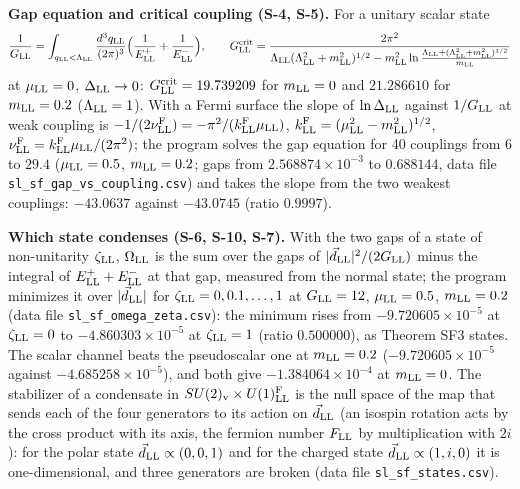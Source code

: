 \documentclass[
  10pt,
]{article}
\begin{document}
\textbf{Gap equation and critical coupling (S-4, S-5).} For a unitary
scalar state
\[\frac1{G_{\rm LL}}=\int_{q_{\rm LL}<\Lambda_{\rm LL}}\frac{d^3q_{\rm LL}}{(2\pi)^3}\Big(\frac1{E^+_{\rm LL}}+\frac1{E^-_{\rm LL}}\Big),\qquad
G^{\rm crit}_{\rm LL}=\frac{2\pi^2}{\Lambda_{\rm LL}(\Lambda_{\rm LL}^2+m_{\rm LL}^2)^{1/2}-m_{\rm LL}^2\ln\frac{\Lambda_{\rm LL}+(\Lambda_{\rm LL}^2+m_{\rm LL}^2)^{1/2}}{m_{\rm LL}}}\]
at \(\mu_{\rm LL}=0\), \(\Delta_{\rm LL}\to0\):
\(G^{\rm crit}_{\rm LL}=19.739209\) for \(m_{\rm LL}=0\) and
\(21.286610\) for \(m_{\rm LL}=0.2\) (\(\Lambda_{\rm LL}=1\)). With a
Fermi surface the slope of \(\ln\Delta_{\rm LL}\) against
\(1/G_{\rm LL}\) at weak coupling is
\(-1/(2\nu^{\rm F}_{\rm LL})=-\pi^2/(k^{\rm F}_{\rm LL}\mu_{\rm LL})\),
\(k^{\rm F}_{\rm LL}=(\mu_{\rm LL}^2-m_{\rm LL}^2)^{1/2}\),
\(\nu^{\rm F}_{\rm LL}=k^{\rm F}_{\rm LL}\mu_{\rm LL}/(2\pi^2)\); the
program solves the gap equation for 40 couplings from \(6\) to \(29.4\)
(\(\mu_{\rm LL}=0.5\), \(m_{\rm LL}=0.2\); gaps from
\(2.568874\times10^{-3}\) to \(0.688144\), data file
\texttt{sl\_sf\_gap\_vs\_coupling.csv}) and takes the slope from the two
weakest couplings: \(-43.0637\) against \(-43.0745\) (ratio \(0.9997\)).

\textbf{Which state condenses (S-6, S-10, S-7).} With the two gaps of a
state of non-unitarity \(\zeta_{\rm LL}\), \(\Omega_{\rm LL}\) is the
sum over the gaps of \(\lvert\vec d_{\rm LL}\rvert^2/(2G_{\rm LL})\)
minus the integral of \(E^+_{\rm LL}+E^-_{\rm LL}\) at that gap,
measured from the normal state; the program minimizes it over
\(\lvert\vec d_{\rm LL}\rvert\) for \(\zeta_{\rm LL}=0,0.1,\dots,1\) at
\(G_{\rm LL}=12\), \(\mu_{\rm LL}=0.5\), \(m_{\rm LL}=0.2\) (data file
\texttt{sl\_sf\_omega\_zeta.csv}): the minimum rises from
\(-9.720605\times10^{-5}\) at \(\zeta_{\rm LL}=0\) to
\(-4.860303\times10^{-5}\) at \(\zeta_{\rm LL}=1\) (ratio \(0.500000\)),
as Theorem SF3 states. The scalar channel beats the pseudoscalar one at
\(m_{\rm LL}=0.2\) (\(-9.720605\times10^{-5}\) against
\(-4.685258\times10^{-5}\)), and both give \(-1.384064\times10^{-4}\) at
\(m_{\rm LL}=0\). The stabilizer of a condensate in
\(SU(2)_{\rm v}\times U(1)^{\rm F}_{\rm LL}\) is the null space of the
map that sends each of the four generators to its action on
\(\vec d_{\rm LL}\) (an isospin rotation acts by the cross product with
its axis, the fermion number \(F_{\rm LL}\) by multiplication with
\(2i\)): for the polar state \(\vec d_{\rm LL}\propto(0,0,1)\) and for
the charged state \(\vec d_{\rm LL}\propto(1,i,0)\) it is
one-dimensional, and three generators are broken (data file
\texttt{sl\_sf\_states.csv}).
\end{document}
